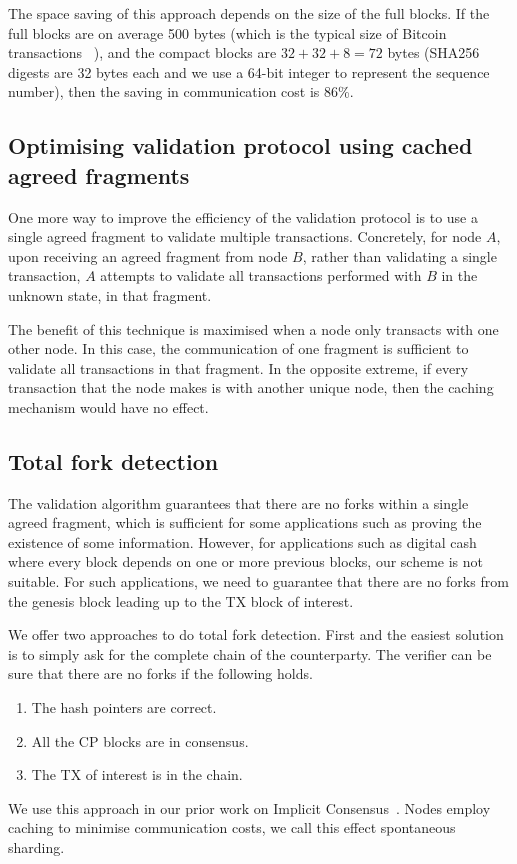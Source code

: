 The space saving of this approach depends on the size of the full blocks.
If the full blocks are on average 500 bytes
(which is the typical size of Bitcoin transactions ~\cite{txsize}),
and the compact blocks are $32 + 32 + 8 = 72$ bytes
(SHA256 digests are 32 bytes each and we use a 64-bit integer to represent the sequence number),
then the saving in communication cost is 86\%.


\subsection{Optimising validation protocol using cached agreed fragments}
\label{sec:caching}
One more way to improve the efficiency of the validation protocol is to use a single agreed fragment to validate multiple transactions.
Concretely, for node $A$, upon receiving an agreed fragment from node $B$,
rather than validating a single transaction,
$A$ attempts to validate all transactions performed with $B$ in the unknown state, in that fragment.

The benefit of this technique is maximised when a node only transacts with one other node.
In this case, the communication of one fragment is sufficient to validate all transactions in that fragment.
In the opposite extreme, if every transaction that the node makes is with another unique node,
then the caching mechanism would have no effect.

\subsection{Total fork detection}
The validation algorithm guarantees that there are no forks within a single agreed fragment,
which is sufficient for some applications such as proving the existence of some information.
However, for applications such as digital cash where every block depends on one or more previous blocks,
our scheme is not suitable.
For such applications, we need to guarantee that there are no forks from the genesis block leading up to the TX block of interest.

We offer two approaches to do total fork detection.
First and the easiest solution is to simply ask for the complete chain of the counterparty.
The verifier can be sure that there are no forks if the following holds.
\begin{enumerate}
    \item The hash pointers are correct.
    \item All the CP blocks are in consensus.
    \item The TX of interest is in the chain.
\end{enumerate}
We use this approach in our prior work on Implicit Consensus~\cite{implicitconsensus}.
Nodes employ caching to minimise communication costs, we call this effect spontaneous sharding.

